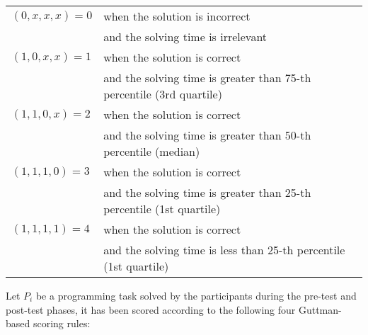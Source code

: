 \begin{center}\small
\begin{tabular}{ll}
$(0,x,x,x) = 0$ & when the solution is incorrect\\
 & and the solving time is irrelevant\\
$(1,0,x,x) = 1$ & when the solution is correct\\
& and the solving time is greater than 75-th percentile (3rd quartile)\\
$(1,1,0,x) = 2$ & when the solution is correct\\
& and the solving time is greater than 50-th percentile (median)\\
$(1,1,1,0) = 3$ & when the solution is correct\\
 & and the solving time is greater than 25-th percentile (1st quartile)\\
$(1,1,1,1) = 4$ & when the solution is correct\\
 & and the solving time is less than 25-th percentile (1st quartile)\\
\end{tabular}
\end{center}

Let $P_{i}$ be a programming task solved by the participants during the pre-test and post-test phases, it has been scored according to the following four Guttman-based scoring rules: 

